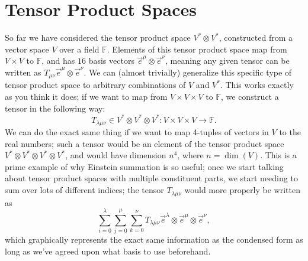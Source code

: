 \chapter{Tensor Product Spaces}
So far we have considered the tensor product space $V^* \otimes V^*$, constructed from a vector space $V$ over a field $\mathbb{F}$.
Elements of this tensor product space map from $V \times V$ to $\mathbb{F}$, and has $16$ basis vectors $\vec{e}^\mu \otimes \vec{e}^\nu$, meaning any given tensor can be written as $T_{\mu\nu} \vec{e}^\mu \otimes \vec{e}^\nu$.
We can (almost trivially) generalize this specific type of tensor product space to arbitrary combinations of $V$ and $V^*$.
This works exactly as you think it does; if we want to map from $V \times V \times V$ to $\mathbb{F}$, we construct a tensor in the following way:
\[ T_{\lambda\mu\nu} \in V^* \otimes V^*\otimes V^* : V \times V \times V \to \mathbb{F}. \]
We can do the exact same thing if we want to map 4-tuples of vectors in $V$ to the real numbers; such a tensor would be an element of the tensor product space $V^* \otimes V^* \otimes V^* \otimes V^*$, and would have dimension $n^4$, where $n = \dim(V)$. This is a prime example of why Einstein summation is so useful; once we start talking about tensor product spaces with multiple constituent parts, we start needing to sum over lots of different indices; the tensor $T_{\lambda\mu\nu}$ would more properly be written as
\[ \sum_{i=0}^{\lambda}\sum_{j=0}^{\mu}\sum_{k=0}^{\nu} T_{\lambda\mu\nu} \vec{e}^\lambda \otimes \vec{e}^\mu \otimes \vec{e}^\nu, \]
which graphically represents the exact same information as the condensed form as long as we've agreed upon what basis to use beforehand.

